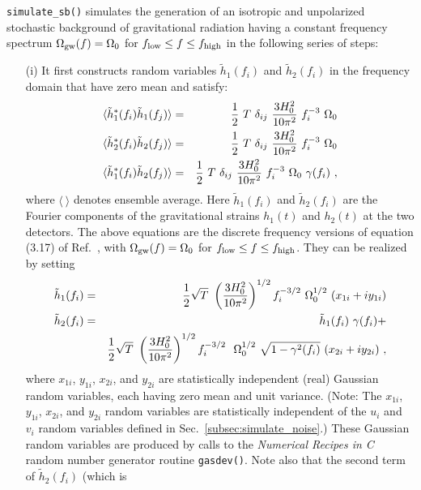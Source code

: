 {\tt simulate\_sb()} simulates the generation of an isotropic and
unpolarized stochastic background of gravitational radiation having
a constant frequency spectrum 
$\Omega_{\rm gw}(f)=\Omega_0$ for $f_{\rm low}\le f\le f_{\rm high}$
in the following series of steps:
%
\begin{itemize}
\item[(i)] It first constructs random variables
$\tilde h_1(f_i)$ and $\tilde h_2(f_i)$
in the frequency domain that have zero mean and satisfy:
%
\begin{eqnarray}
\langle \tilde h_1^*(f_i)\tilde h_1(f_j)\rangle&=&
{1\over 2}\ T\ \delta_{ij}\ {3H_0^2\over 10\pi^2}\ f_i^{-3}\ \Omega_0
\label{eq:e1}\\
\langle \tilde h_2^*(f_i)\tilde h_2(f_j)\rangle&=&
{1\over 2}\ T\ \delta_{ij}\ {3H_0^2\over 10\pi^2}\ f_i^{-3}\ \Omega_0
\label{eq:e2}\\
\langle \tilde h_1^*(f_i)\tilde h_2(f_j)\rangle&=&
{1\over 2}\ T\ \delta_{ij}\ {3H_0^2\over 10\pi^2}\ f_i^{-3}\ \Omega_0
\ \gamma(f_i)\ ,
\end{eqnarray}
%
where $\langle\ \rangle$ denotes ensemble average.
Here $\tilde h_1(f_i)$ and $\tilde h_2(f_i)$ 
are the Fourier components of the gravitational strains
$h_1(t)$ and $h_2(t)$ at the two detectors.
The above equations are the discrete frequency versions of equation
(3.17) of Ref.~\cite{AllenReview}, with $\Omega_{\rm gw}(f)=\Omega_0$ for
$f_{\rm low}\le f\le f_{\rm high}$.
They can be realized by setting
%
\begin{eqnarray}
\tilde h_1(f_i)&=&{1\over 2}\sqrt{T}\ \left({3H_0^2\over 10\pi^2}\right)^{1/2}
f_i^{-3/2}\ \Omega_0^{1/2}\  (x_{1i} + i y_{1i})\\
\tilde h_2(f_i)&=&\tilde h_1(f_i)\ \gamma(f_i)+\\
&&{1\over 2}\sqrt{T}\ \left({3H_0^2\over 10\pi^2}\right)^{1/2}
f_i^{-3/2}\ \ \Omega_0^{1/2}\ 
\sqrt{1-\gamma^2(f_i)}\ (x_{2i}+i y_{2i})\ ,
\label{eq:eel}
\end{eqnarray}
%
where 
$x_{1i}$, $y_{1i}$, $x_{2i}$, and $y_{2i}$ are statistically 
independent (real) Gaussian random variables, each having zero mean 
and unit variance.
(Note: The $x_{1i}$, $y_{1i}$, $x_{2i}$, and $y_{2i}$ random
variables are statistically independent of the $u_i$ and $v_i$ 
random variables defined in Sec.~\ref{subsec:simulate_noise}.) 
These Gaussian random variables are produced by calls to 
the {\it Numerical Recipes in C} random number generator routine 
{\tt gasdev()}.
Note also that the second term of $\tilde h_2(f_i)$ (which is

\end{itemize}
